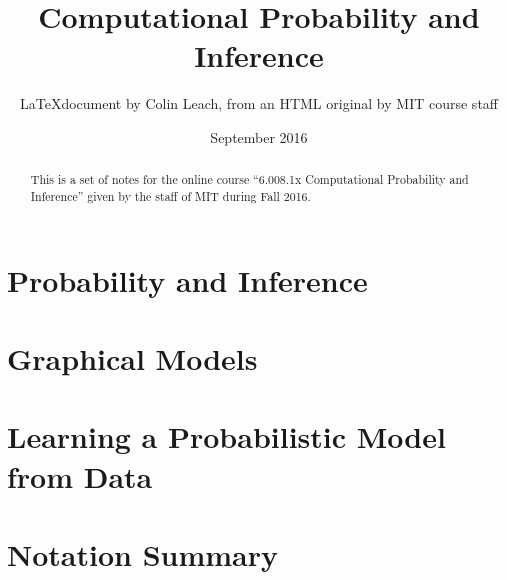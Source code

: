 



\title{Computational Probability and Inference}
\author{\LaTeX document by Colin Leach, from an HTML original by MIT course staff\\}
\date{September 2016}
\maketitle

\begin{abstract}
This is a set of notes for the online course ``6.008.1x Computational Probability and Inference'' given by the staff of MIT during Fall 2016.
\end{abstract}

\tableofcontents

\setlength{\parindent}{0pt}
\setlength{\parskip}{0.5em}
\setlength{\intextsep}{2mm}

\chapter{Probability and Inference}









\chapter{Graphical Models}


\chapter{Learning a Probabilistic Model from Data}

\appendix
\chapter{Notation Summary}



